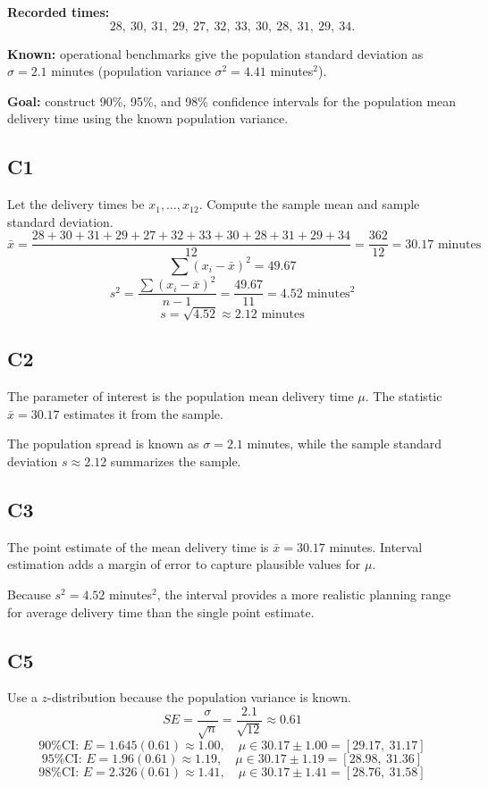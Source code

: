 \begin{ExamProblems}
		\textbf{Recorded times:}
		\[
		28,\ 30,\ 31,\ 29,\ 27,\ 32,\ 33,\ 30,\ 28,\ 31,\ 29,\ 34.
		\]
		
		\textbf{Known:} operational benchmarks give the population standard deviation as $\sigma = 2.1$ minutes (population variance $\sigma^2 = 4.41$ minutes$^2$).
		
		\textbf{Goal:} construct 90\%, 95\%, and 98\% confidence intervals for the population mean delivery time using the known population variance.
		
		\subsection*{C1}
		Let the delivery times be $x_1,\dots,x_{12}$. Compute the sample mean and sample standard deviation.
		\[
		\bar{x} = \frac{28 + 30 + 31 + 29 + 27 + 32 + 33 + 30 + 28 + 31 + 29 + 34}{12}
		= \frac{362}{12} = 30.17 \text{ minutes}
		\]
		\[
		\sum (x_i-\bar{x})^2 = 49.67
		\]
		\[
		s^2 = \frac{\sum (x_i-\bar{x})^2}{n-1} = \frac{49.67}{11} = 4.52 \text{ minutes}^2
		\]
		\[
		s = \sqrt{4.52} \approx 2.12 \text{ minutes}
		\]
		
		\subsection*{C2}
		The parameter of interest is the population mean delivery time $\mu$. The statistic $\bar{x} = 30.17$ estimates it from the sample.
		
		The population spread is known as $\sigma = 2.1$ minutes, while the sample standard deviation $s \approx 2.12$ summarizes the sample.
		
		\subsection*{C3}
		The point estimate of the mean delivery time is $\bar{x} = 30.17$ minutes. Interval estimation adds a margin of error to capture plausible values for $\mu$.
		
		Because $s^2 = 4.52$ minutes$^2$, the interval provides a more realistic planning range for average delivery time than the single point estimate.
		
		\subsection*{C5}
		Use a $z$-distribution because the population variance is known.
		\[
		SE = \frac{\sigma}{\sqrt{n}} = \frac{2.1}{\sqrt{12}} \approx 0.61
		\]
		\[
		\text{90\% CI: } E = 1.645(0.61) \approx 1.00, \quad \mu \in 30.17 \pm 1.00 = [29.17,\ 31.17]
		\]
		\[
		\text{95\% CI: } E = 1.96(0.61) \approx 1.19, \quad \mu \in 30.17 \pm 1.19 = [28.98,\ 31.36]
		\]
		\[
		\text{98\% CI: } E = 2.326(0.61) \approx 1.41, \quad \mu \in 30.17 \pm 1.41 = [28.76,\ 31.58]
		\]
		

\end{ExamProblems}
